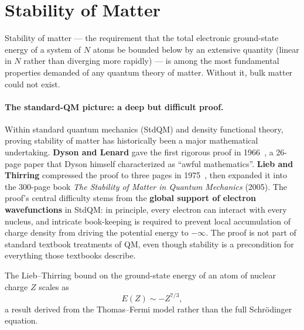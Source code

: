 \documentclass[11pt]{article}
\begin{document}
\section{Stability of Matter}\label{sec:som}

Stability of matter --- the requirement that the total electronic ground-state energy of a system of $N$ atoms be bounded below by an extensive quantity (linear in $N$ rather than diverging more rapidly) --- is among the most fundamental properties demanded of any quantum theory of matter. Without it, bulk matter could not exist.

\paragraph{The standard-QM picture: a deep but difficult proof.}
Within standard quantum mechanics (StdQM) and density functional theory, proving stability of matter has historically been a major mathematical undertaking. \textbf{Dyson and Lenard} gave the first rigorous proof in 1966~\cite{DysonLenard67}, a 26-page paper that Dyson himself characterized as ``awful mathematics''. \textbf{Lieb and Thirring} compressed the proof to three pages in 1975~\cite{LiebThirring75}, then expanded it into the 300-page book \emph{The Stability of Matter in Quantum Mechanics} (2005). The proof's central difficulty stems from the \textbf{global support of electron wavefunctions} in StdQM: in principle, every electron can interact with every nucleus, and intricate book-keeping is required to prevent local accumulation of charge density from driving the potential energy to $-\infty$. The proof is not part of standard textbook treatments of QM, even though stability is a precondition for everything those textbooks describe.

The Lieb--Thirring bound on the ground-state energy of an atom of nuclear charge $Z$ scales as
\begin{equation}
E(Z) \sim -Z^{7/3},
\end{equation}
a result derived from the Thomas--Fermi model rather than the full Schr\"odinger equation.
\end{document}
